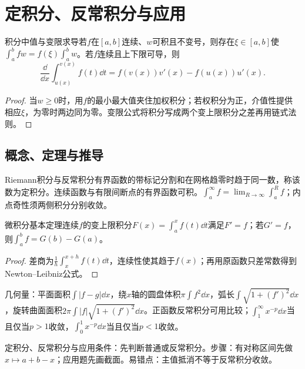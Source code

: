 \section{定积分、反常积分与应用}\label{sec:3:4}

\begin{theorem}{积分中值与变限求导}若$f$在$[a,b]$连续、$w$可积且不变号，则存在$\xi\in[a,b]$使$\int_a^bfw=f(\xi)\int_a^bw$。若$f$连续且上下限可导，则
\[\dfrac\dd{\dd x}\int_{u(x)}^{v(x)}f(t)\dd t=f(v(x))v\prime(x)-f(u(x))u\prime(x).\]
\end{theorem}
\begin{proof}当$w\ge0$时，用$f$的最小最大值夹住加权积分；若权积分为正，介值性提供相应$\xi$，为零时两边同为零。变限公式将积分写成两个变上限积分之差再用链式法则。\end{proof}

\subsection{概念、定理与推导}

\begin{definition}{Riemann积分与反常积分}有界函数的带标记分割和在网格趋零时趋于同一数，称该数为定积分。连续函数与有限间断点的有界函数可积。$\int_a^\infty f=\lim_{R\to\infty}\int_a^R f$；内点奇性须两侧积分分别收敛。\end{definition}
\begin{theorem}{微积分基本定理}连续$f$的变上限积分$F(x)=\int_a^x f(t)\dd t$满足$F\prime=f$；若$G\prime=f$，则$\int_a^bf=G(b)-G(a)$。\end{theorem}
\begin{proof}差商为$\frac1h\int_x^{x+h}f(t)\dd t$，连续性使其趋于$f(x)$；再用原函数只差常数得到Newton--Leibniz公式。\end{proof}
几何量：平面面积$\int|f-g|\dd x$，绕$x$轴的圆盘体积$\pi\int f^2\dd x$，弧长$\int\sqrt{1+(f\prime)^2}\dd x$，旋转曲面面积$2\pi\int|f|\sqrt{1+(f\prime)^2}\dd x$。正函数反常积分可用比较；$\int_1^\infty x^{-p}\dd x$当且仅当$p>1$收敛，$\int_0^1x^{-p}\dd x$当且仅当$p<1$收敛。

\begin{method}{定积分、反常积分与应用}条件：先判断普通或反常积分。步骤：有对称区间先做$x\mapsto a+b-x$；应用题先画截面。易错点：主值抵消不等于反常积分收敛。\end{method}

